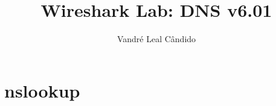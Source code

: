 \documentclass[11pt]{article}
\begin{document}
%
\author{Vandré Leal Cândido}
\title{Wireshark Lab: DNS v6.01}
\maketitle

\section{nslookup}

\end{document}
